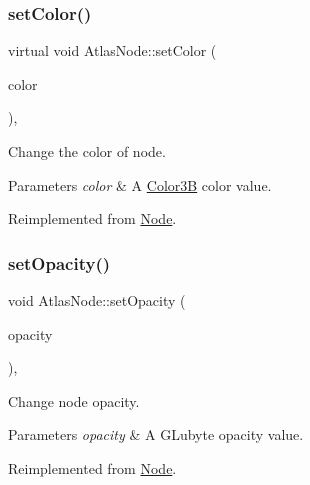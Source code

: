\subsubsection{\texorpdfstring{set\+Color()}{setColor()}\hspace{0.1cm}{\footnotesize\ttfamily [2/2]}}
{\footnotesize\ttfamily virtual void Atlas\+Node\+::set\+Color (\begin{DoxyParamCaption}\item[{const \hyperlink{structColor3B}{Color3B} \&}]{color }\end{DoxyParamCaption})\hspace{0.3cm}{\ttfamily [override]}, {\ttfamily [virtual]}}

Change the color of node. 
\begin{DoxyParams}{Parameters}
{\em color} & A \hyperlink{structColor3B}{Color3B} color value. \\
\hline
\end{DoxyParams}


Reimplemented from \hyperlink{classNode_af45037de5b13602263b1ce51b50cafdd}{Node}.

\mbox{\label{classAtlasNode_a396e36e894a70722806e90c7101207bc}} 
\subsubsection{\texorpdfstring{set\+Opacity()}{setOpacity()}\hspace{0.1cm}{\footnotesize\ttfamily [1/2]}}
{\footnotesize\ttfamily void Atlas\+Node\+::set\+Opacity (\begin{DoxyParamCaption}\item[{G\+Lubyte}]{opacity }\end{DoxyParamCaption})\hspace{0.3cm}{\ttfamily [override]}, {\ttfamily [virtual]}}

Change node opacity. 
\begin{DoxyParams}{Parameters}
{\em opacity} & A G\+Lubyte opacity value. \\
\hline
\end{DoxyParams}


Reimplemented from \hyperlink{classNode_ae41a9db63bfa3d466ee7c9d79c35352d}{Node}.

\mbox{\label{classAtlasNode_af95a54e5d5157983414cad3d837853eb}} 
